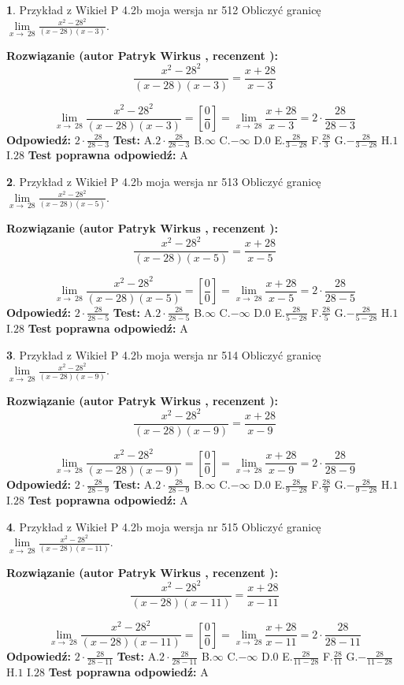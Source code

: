 \documentclass[12pt, a4paper]{article}
\theoremstyle{definition} %
\newtheorem{zad}{}
\newcommand{\zadStart}[1]{\begin{zad}#1\newline}
\newcommand{\zadStop}{\end{zad}}
\newcommand{\rozwStart}[2]{\noindent \textbf{Rozwiązanie (autor #1 , recenzent #2): }\newline}
\newcommand{\rozwStop}{\newline}
\newcommand{\odpStart}{\noindent \textbf{Odpowiedź:}\newline}
\newcommand{\odpStop}{\newline}
\newcommand{\testStart}{\noindent \textbf{Test:}\newline}
\newcommand{\testStop}{\newline}
\newcommand{\kluczStart}{\noindent \textbf{Test poprawna odpowiedź:}\newline}
\newcommand{\kluczStop}{\newline}
\begin{document}
\zadStart{Przykład z Wikieł P 4.2b moja wersja nr 512}
Obliczyć granicę $\lim\limits_{x\to\ 28}\frac{x^{2}-28^{2}}{(x-28)(x-3)}$.
\zadStop
\rozwStart{Patryk Wirkus}{}
$$\frac{x^{2}-28^{2}}{(x-28)(x-3)}=\frac{x+28}{x-3}$$

$$\lim\limits_{x\to\ 28}\frac{x^{2}-28^{2}}{(x-28)(x-3)}=[\frac{0}{0}]=\lim\limits_{x\to\ 28}\frac{x+28}{x-3}=2 \cdot \frac{28}{28-3}$$
\rozwStop
\odpStart
$2 \cdot \frac{28}{28-3}$
\odpStop
\testStart
A.$2 \cdot \frac{28}{28-3}$
B.$\infty$
C.$-\infty$
D.$0$
E.$\frac{28}{3-28}$
F.$\frac{28}{3}$
G.$-\frac{28}{3-28}$
H.$1$
I.$28$
\testStop
\kluczStart
A
\kluczStop



\zadStart{Przykład z Wikieł P 4.2b moja wersja nr 513}
Obliczyć granicę $\lim\limits_{x\to\ 28}\frac{x^{2}-28^{2}}{(x-28)(x-5)}$.
\zadStop
\rozwStart{Patryk Wirkus}{}
$$\frac{x^{2}-28^{2}}{(x-28)(x-5)}=\frac{x+28}{x-5}$$

$$\lim\limits_{x\to\ 28}\frac{x^{2}-28^{2}}{(x-28)(x-5)}=[\frac{0}{0}]=\lim\limits_{x\to\ 28}\frac{x+28}{x-5}=2 \cdot \frac{28}{28-5}$$
\rozwStop
\odpStart
$2 \cdot \frac{28}{28-5}$
\odpStop
\testStart
A.$2 \cdot \frac{28}{28-5}$
B.$\infty$
C.$-\infty$
D.$0$
E.$\frac{28}{5-28}$
F.$\frac{28}{5}$
G.$-\frac{28}{5-28}$
H.$1$
I.$28$
\testStop
\kluczStart
A
\kluczStop



\zadStart{Przykład z Wikieł P 4.2b moja wersja nr 514}
Obliczyć granicę $\lim\limits_{x\to\ 28}\frac{x^{2}-28^{2}}{(x-28)(x-9)}$.
\zadStop
\rozwStart{Patryk Wirkus}{}
$$\frac{x^{2}-28^{2}}{(x-28)(x-9)}=\frac{x+28}{x-9}$$

$$\lim\limits_{x\to\ 28}\frac{x^{2}-28^{2}}{(x-28)(x-9)}=[\frac{0}{0}]=\lim\limits_{x\to\ 28}\frac{x+28}{x-9}=2 \cdot \frac{28}{28-9}$$
\rozwStop
\odpStart
$2 \cdot \frac{28}{28-9}$
\odpStop
\testStart
A.$2 \cdot \frac{28}{28-9}$
B.$\infty$
C.$-\infty$
D.$0$
E.$\frac{28}{9-28}$
F.$\frac{28}{9}$
G.$-\frac{28}{9-28}$
H.$1$
I.$28$
\testStop
\kluczStart
A
\kluczStop



\zadStart{Przykład z Wikieł P 4.2b moja wersja nr 515}
Obliczyć granicę $\lim\limits_{x\to\ 28}\frac{x^{2}-28^{2}}{(x-28)(x-11)}$.
\zadStop
\rozwStart{Patryk Wirkus}{}
$$\frac{x^{2}-28^{2}}{(x-28)(x-11)}=\frac{x+28}{x-11}$$

$$\lim\limits_{x\to\ 28}\frac{x^{2}-28^{2}}{(x-28)(x-11)}=[\frac{0}{0}]=\lim\limits_{x\to\ 28}\frac{x+28}{x-11}=2 \cdot \frac{28}{28-11}$$
\rozwStop
\odpStart
$2 \cdot \frac{28}{28-11}$
\odpStop
\testStart
A.$2 \cdot \frac{28}{28-11}$
B.$\infty$
C.$-\infty$
D.$0$
E.$\frac{28}{11-28}$
F.$\frac{28}{11}$
G.$-\frac{28}{11-28}$
H.$1$
I.$28$
\testStop
\kluczStart
A
\kluczStop
\end{document}
